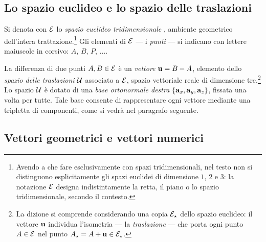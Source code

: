 \subsection{Lo spazio euclideo e lo spazio delle traslazioni}
\label{sec:spazio_euclideo}

Si denota con $\mathcal{E}$ lo \emph{spazio euclideo tridimensionale}%
, 
ambiente geometrico dell'intera trattazione.\footnote{Avendo a che 
	fare esclusivamente con spazi tridimensionali, nel testo non si 
	distinguono esplicitamente gli spazi euclidei di dimensione $1$, 
	$2$ e $3$: la notazione $\mathcal{E}$ designa indistintamente la retta, 
	il piano o lo spazio tridimensionale, secondo il contesto.} Gli 
elementi di $\mathcal{E}$ --- i \emph{punti} --- si indicano con lettere 
maiuscole in corsivo: $A$, $B$, $P$, $\ldots$.

La differenza di due punti $A, B \in \mathcal{E}$ è un \textit{vettore} 
$\mathbf{u} = B - A$, elemento dello \textit{spazio delle traslazioni} 
$\mathcal{U}$ associato a $\mathcal{E}$, spazio vettoriale reale di dimensione 
tre.\footnote{La dizione si comprende considerando una copia 
	$\mathcal{E}_\star$ dello spazio euclideo: il vettore $\mathbf{u}$ individua 
	l'isometria --- la \emph{traslazione} --- che porta ogni punto 
	$A \in \mathcal{E}$ nel punto $A_\star = A + \mathbf{u} \in \mathcal{E}_\star$.} Lo 
spazio $\mathcal{U}$ è dotato di una \textit{base ortonormale destra} 
$\{\mathbf{a}_x, \mathbf{a}_y, \mathbf{a}_z\}$, fissata una volta per tutte. Tale 
base consente di rappresentare ogni vettore mediante una 
tripletta di componenti, come si vedrà nel paragrafo seguente.

\subsection{Vettori geometrici e vettori numerici}
\label{sec:vettori_geom_num}

